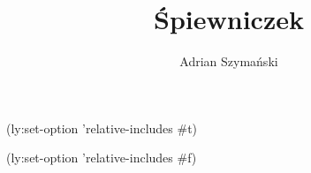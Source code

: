 \documentclass{article}
\title{Śpiewniczek}
\author{Adrian Szymański}
\begin{document}
\maketitle
\newpage
\tableofcontents

(ly:set-option 'relative-includes #t)




(ly:set-option 'relative-includes #f)
\end{document}
